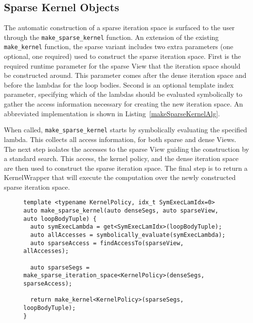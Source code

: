 \subsection{Sparse Kernel Objects}

The automatic construction of a sparse iteration space is surfaced to the user through the \verb.make_sparse_kernel. function.
An extension of the existing \verb.make_kernel. function, the sparse variant includes two extra parameters (one optional, one required) used to construct the sparse iteration space.
First is the required runtime parameter for the sparse View that the iteration space should be constructed around.
This parameter comes after the dense iteration space and before the lambdas for the loop bodies.
Second is an optional template index parameter, specifying which of the lambdas should be evaluated symbolically to gather the access information necessary for creating the new iteration space.
An abbreviated implementation is shown in Listing~\ref{makeSparseKernelAlg}.

When called, \verb.make_sparse_kernel. starts by symbolically evaluating the specified lambda.
This collects all access information, for both sparse and dense Views.
The next step isolates the accesses to the sparse View guiding the construction by a standard search.
This access, the kernel policy, and the dense iteration space are then used to construct the sparse iteration space.
The final step is to return a KernelWrapper that will execute the computation over the newly constructed sparse iteration space.

\begin{figure}
\begin{lstlisting}[caption={Abbreviated implementation of the function for creating a computation that automatically constructs the sparse iteration space.}, label=makeSparseKernelAlg]
template <typename KernelPolicy, idx_t SymExecLamIdx=0>
auto make_sparse_kernel(auto denseSegs, auto sparseView, auto loopBodyTuple) {
  auto symExecLambda = get<SymExecLamIdx>(loopBodyTuple);
  auto allAccesses = symbolically_evaluate(symExecLambda);
  auto sparseAccess = findAccessTo(sparseView, allAccesses);

  auto sparseSegs = make_sparse_iteration_space<KernelPolicy>(denseSegs, sparseAccess);

  return make_kernel<KernelPolicy>(sparseSegs, loopBodyTuple);
}
\end{lstlisting}
\end{figure}

